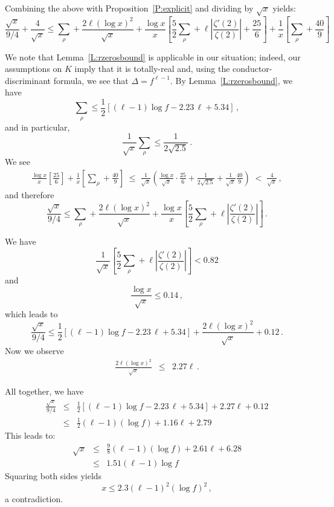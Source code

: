 \documentclass{amsart}
\numberwithin{equation}{section}
\numberwithin{table}{section}
\begin{document}
Combining the above with Proposition~\ref{P:explicit} and dividing by $\sqrt{x}$ yields:
$$
  \frac{\sqrt{x}}{9/4}
  +
  \frac{4}{\sqrt{x}}
  \leq
  
  \sum_\rho
  +
  \frac{2\ell(\log x)^2}{\sqrt{x}}
  +
  \frac{\log x}{x}
  \left[
  \frac{5}{2}\sum_\rho+\ell
  \left|\frac{\zeta'(2)}{\zeta(2)}\right|+\frac{25}{6}
  \right]
  +
  \frac{1}{x}
  \left[
  \sum_\rho
  +
  \frac{40}{9}
  \right]
$$

We note that Lemma~\ref{L:rzerosbound} is applicable in our situation;
indeed, our assumptions on $K$ imply that it is totally-real and, using
the conductor-discriminant formula, we see that $\Delta=f^{\ell-1}$.
By Lemma~\ref{L:rzerosbound},
we have
$$
  \sum_\rho\leq
  \frac{1}{2}
  \left[
  (\ell-1)\log f-
  2.23\,\ell
  +5.34
  \right]
  
  \,,
$$
and in particular,
$$
  \frac{1}{\sqrt{x}}\sum_\rho\leq\frac{1}{2\sqrt{2.5}}
  \,.
$$
We see
\begin{eqnarray*}
  \frac{\log x}{x}
  \left[
  \frac{25}{6}
  \right]
  +
  \frac{1}{x}
  \left[
  \sum_\rho
  +
  \frac{40}{9}
  \right]
   \;\leq\;
  \frac{1}{\sqrt{x}}
  \left(
        \frac{\log x}{\sqrt{x}}
  \cdot
  \frac{25}{6}
  +
  \frac{1}{2\sqrt{2.5}}
  +
  \frac{1}{\sqrt{x}}
  \frac{40}{9}
  \right)
  \;<\;
  \frac{4}{\sqrt{x}}
  \,,
\end{eqnarray*}
and therefore
$$
  \frac{\sqrt{x}}{9/4}
  \leq
  
  \sum_\rho
  +
  \frac{2\ell(\log x)^2}{\sqrt{x}}
  +
  \frac{\log x}{x}
  \left[
  \frac{5}{2}\sum_\rho+\ell
  \left|\frac{\zeta'(2)}{\zeta(2)}\right|
  \right]
  \,.
$$

We have
$$
  \frac{1}{\sqrt{x}}\left[
  \frac{5}{2}\sum_\rho
  +
  \ell\left|\frac{\zeta'(2)}{\zeta(2)}\right|
  \right]
  <
 0.82
$$
and
$$
\frac{\log x}{\sqrt{x}}
\leq
0.14
\,,
$$
which leads to
$$
  \frac{\sqrt{x}}{9/4}
  \leq
    \frac{1}{2}
  \left[
  (\ell-1)\log f-
  2.23\,\ell
  +5.34
  \right]
  +
  \frac{2\ell(\log x)^2}{\sqrt{x}}
  +
  0.12
  \,.
$$
Now we observe
\begin{eqnarray*}
  \frac{2\ell(\log x)^2}{\sqrt{x}}
  &\leq&
  2.27\ell
  \,.
\end{eqnarray*}

All together, we have
\begin{eqnarray*}
  \frac{\sqrt{x}}{9/4}
  &\leq&
      \frac{1}{2}
  \left[
  (\ell-1)\log f-
  2.23\,\ell
  +5.34
  \right]
  +
  2.27\ell
  +
  0.12
  \\
  &\leq&
  \frac{1}{2}(\ell-1)(\log f)+1.16\ell+2.79
\end{eqnarray*}
This leads to:
\begin{eqnarray*}
  \sqrt{x}
  &\leq&
  \frac{9}{8}(\ell-1)(\log f)
  +
  2.61\ell
  +
  6.28
  \\
  &\leq&
  1.51(\ell-1)\log f
\end{eqnarray*}
Squaring both sides yields
$$
  x\leq 2.3(\ell-1)^2(\log f)^2
  \,,
$$
a contradiction.
{\raisebox{-.25ex}{\scalebox{.786}[1.272]{$\blacksquare$}}}
\end{document}

